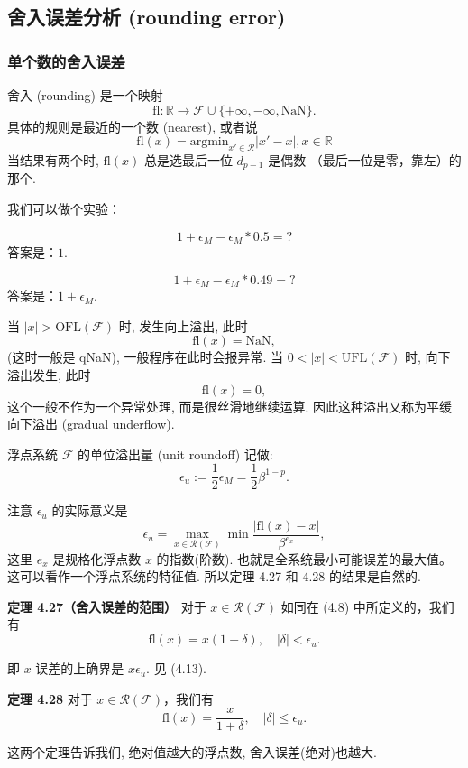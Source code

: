 \documentclass[a4paper]{ctexart}
\begin{document}
{\subsection{舍入误差分析 (rounding error)}

\subsubsection{单个数的舍入误差}
 舍入 (rounding) 是一个映射
$$
\mbox{fl} : \mathbb{R} \to \mathscr{F} \cup \{+\infty, -\infty, \mbox{NaN}\}.
$$
具体的规则是最近的一个数 (nearest), 或者说
$$
\mbox{fl}(x) = \mbox{argmin}_{x' \in \mathscr{R}} |x' - x|, x \in \mathbb{R}
$$
当结果有两个时, $\mbox{fl}(x)$ 总是选最后一位 $d_{p - 1}$ 是偶数 （最后一位是零，靠左）的那个.

我们可以做个实验：

$$
1 + \epsilon_M - \epsilon_M * 0.5 = ? 
$$
答案是：$1$.

$$
1 + \epsilon_M - \epsilon_M * 0.49 = ? 
$$
答案是：$1 + \epsilon_M$.

 当 $|x| > \mbox{OFL}(\mathscr{F})$ 时, 发生向上溢出, 此时
$$
\mbox{fl}(x) = \mbox{NaN},
$$
(这时一般是 qNaN), 一般程序在此时会报异常. 当 $0 < |x| < \mbox{UFL}(\mathscr{F})$ 时,
向下溢出发生, 此时
$$
\mbox{fl}(x) = 0,
$$
这个一般不作为一个异常处理, 而是很丝滑地继续运算. 因此这种溢出又称为平缓向下溢出
(gradual underflow).

 浮点系统 $\mathscr{F}$ 的单位溢出量 (unit roundoff) 记做:
$$
\epsilon_u := \frac{1}{2}\epsilon_M = \frac{1}{2}\beta^{1 - p}.
$$

注意 $\epsilon_u$ 的实际意义是
$$
\epsilon_u = \max_{x \in \mathscr{R}(\mathscr{F})}\min
\frac{|\mbox{fl}(x) - x|}{\beta^{e_x}},
$$
这里 $e_x$ 是规格化浮点数 $x$ 的指数(阶数). 也就是全系统最小可能误差的最大值。
这可以看作一个浮点系统的特征值. 所以定理 4.27 和 4.28 的结果是自然的.

\noindent \textbf{定理 4.27（舍入误差的范围） } 对于 \( x \in \mathcal{R}(\mathcal{F}) \) 如同在 (4.8) 中所定义的，我们有
\[ 
\text{fl}(x) = x(1 + \delta), \quad |\delta| < \epsilon_{u}. \tag{4.12} 
\]

即 $x$ 误差的上确界是 $x \epsilon_u$. 见 (4.13).

\noindent \textbf{定理 4.28 } 对于 \( x \in \mathcal{R}(\mathcal{F}) \)，我们有
\[ 
\text{fl}(x) = \frac{x}{1 + \delta}, \quad |\delta| \leq \epsilon_{u}. \tag{4.14} 
\]

这两个定理告诉我们, 绝对值越大的浮点数, 舍入误差(绝对)也越大.


}
\end{document}
